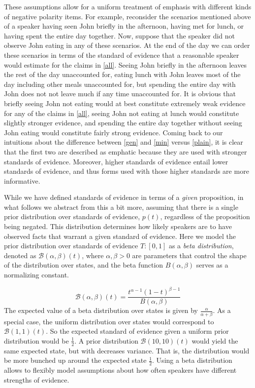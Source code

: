 \documentclass[linguex]{sp}
\theoremstyle{definition} \newtheorem{definition}{Definition}
\begin{document}
These assumptions allow for a uniform treatment of emphasis with different kinds of negative polarity items. For example, reconsider the scenarios mentioned above of a speaker having seen John briefly in the afternoon, having met for lunch, or having spent the entire day together. Now, suppose that the speaker did not observe John eating in any of these scenarios.  At the end of the day we can order these scenarios in terms of the standard of evidence that a reasonable speaker would estimate for the claims in \ref{all}. Seeing John briefly in the afternoon leaves the rest of the day unaccounted for, eating lunch with John leaves most of the day including other meals unaccounted for, but spending the entire day with John does not not leave much if any time unaccounted for. It is obvious that briefly seeing John not eating would at best constitute extremely weak evidence for any of the claims in \ref{all}, seeing John not eating at lunch would constitute slightly stronger evidence, and spending the entire day together without seeing John eating would constitute fairly strong evidence.  Coming back to our intuitions about the difference between \ref{gen} and \ref{min} versus \ref{plain}, it is clear that the first two are described as emphatic because they are used with stronger standards of evidence. Moreover, higher standards of evidence entail lower standards of evidence, and thus forms used with those higher standards are more informative.

While we have defined standards of evidence in terms of a \emph{given} proposition, in what follows we abstract from this a bit more, assuming that there is a single prior distribution over standards of evidence, $p(t)$, regardless of the proposition being negated. This distribution determines how likely speakers are to have observed facts that warrant a given standard of evidence. Here we model the prior distribution over standards of evidence $T : [0, 1]$ as a \emph{beta distribution}, denoted as $\mathcal{B}(\alpha, \beta)(t)$, where $\alpha, \beta > 0$ are parameters that control the shape of the distribution over states, and the beta function $B(\alpha, \beta)$ serves as a normalizing constant.

\begin{equation}
	\mathcal{B}(\alpha, \beta)(t) = \frac{t^{\alpha -1 }(1-t)^{\beta -1 }}{B(\alpha, \beta)}
\end{equation}
The expected value of a beta distribution over states is given by $\frac{\alpha}{\alpha + \beta}$. As a special case, the uniform distribution over states would correspond to $\mathcal{B}(1,1)(t)$. So the expected standard of evidence given a uniform prior distribution would be $\frac{1}{2}$. A prior distribution $\mathcal{B}(10,10)(t)$ would yield the same expected state, but with decreases variance. That is, the distribution would be more bunched up around the expected state $\frac{1}{2}$. Using a beta distribution allows to flexibly model assumptions about how often speakers have different strengths of evidence.
\end{document}
